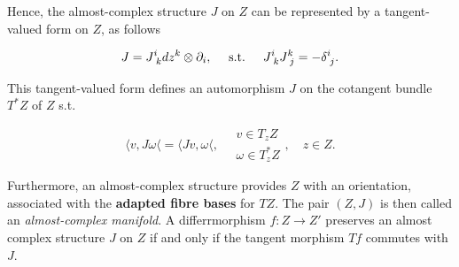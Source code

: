 Hence, the almost-complex structure $J$ on $Z$ can be represented by a tangent-valued form on $Z$, as follows 

\begin{equation}
    J = J^{i}_{\textnormal{ } k} dz^k \otimes \partial_i, \quad \textnormal{ s.t. } \quad J^{i}_{\textnormal{ } k} J^{k}_{\textnormal{ } j} = - \delta^{i}_{\textnormal{ } j}. 
\end{equation}

This tangent-valued form defines an automorphism $J$ on the cotangent bundle $T^{*}Z$ of $Z$ s.t. 

\begin{equation*}
    \langle v, J \omega \langle = \langle J v, \omega \langle, \quad \begin{array}{cc}
         v \in T_z Z  \\
         \omega \in T_z^{*}Z 
    \end{array}, \quad z \in Z.
\end{equation*}

Furthermore, an almost-complex structure provides $Z$ with an orientation, associated with the \textbf{adapted fibre bases} for $TZ$. 
The pair $(Z,J)$ is then called an \textit{almost-complex manifold}. A differrmorphism $f: Z \rightarrow Z'$ preserves an almost complex structure $J$ on $Z$ if and only if the tangent morphism $Tf$ commutes with $J$. \medbreak






